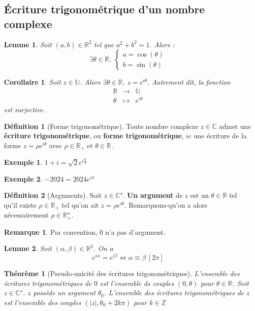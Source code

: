 \documentclass[french]{book}
\newcommand{\Z}{\mathbb{Z}}
\newcommand{\R}{\mathbb{R}}
\newcommand{\C}{\mathbb{C}}
\newcommand{\U}{\mathbb{U}}
\newcommand{\st}{^\star}
\theoremstyle{plain}
\newtheorem{thm}{Théorème}[chapter]
\newtheorem{lem}{Lemme}[chapter]
\newtheorem{cor}{Corollaire}[chapter]
\theoremstyle{definition}
\newtheorem{dfn}{Définition}[chapter]
\newtheorem{exa}{Exemple}[chapter]
\newtheorem{rmq}{Remarque}[chapter]
\theoremstyle{remark}
\begin{document}
\subsection{Écriture trigonométrique d'un nombre complexe}
\begin{lem}
	Soit $(a,b)\in\R^2$ tel que $a^2+b^2=1$. Alors : $$\exists\theta\in\R,\ \begin{cases}
		a=\cos(\theta)\\ b=\sin(\theta)
	\end{cases}$$
\end{lem}
\begin{cor}
	Soit $z\in\U$. Alors $\exists\theta\in\R,\ z=e^{i\theta}$. Autrement dit, la fonction $$\begin{array}{ccc}\R&\rightarrow&\U\\ \theta&\mapsto&e^{i\theta}\end{array}$$ est surjective.
\end{cor}
\begin{dfn}[Forme trigonométrique]
	Toute nombre complexe $z\in\C$ admet une \textbf{écriture trigonométrique}, ou \textbf{forme trigonométrique}, $ie$ une écriture de la forme $z=\rho e^{i\theta}$ avec $\rho\in\R_+$ et $\theta\in\R$.
\end{dfn}
\begin{exa}
	$1+i=\sqrt{2}e^{i\frac{\pi}{4}}$
\end{exa}
\begin{exa}
	$-2024=2024e^{i\pi}$
\end{exa}
\begin{dfn}[Arguments]
	Soit $z\in\C\st$. \textbf{Un argument} de $z$ est un $\theta\in\R$ tel qu'il existe $\rho\in\R_+$ tel qu'on ait $z=\rho e^{i\theta}$. Remarquons-qu'on a alors nécessairement $\rho\in\R_+\st$.
\end{dfn}
\begin{rmq}
	Par convention, $0$ n'a pas d'argument.
\end{rmq}
\begin{lem}
	Soit $(\alpha,\beta)\in\R^2$. On a $$e^{i\alpha}=e^{i\beta}\iff\alpha\equiv\beta\ [2\pi]$$
\end{lem}
\begin{thm}[Pseudo-unicité des écritures trigonométriques]
	L'ensemble des écritures trigonométriques de $0$ est l'ensemble ds couples $(0,\theta)$ pour $\theta\in\R$. Soit $z\in\C\st$. $z$ possède un argument $\theta_0$. L'ensemble des écritures trigonométriques de $z$ est l'ensemble des couples $(\lvert z\rvert,\theta_0+2k\pi)$ pour $k\in\Z$
\end{thm}
\end{document}
